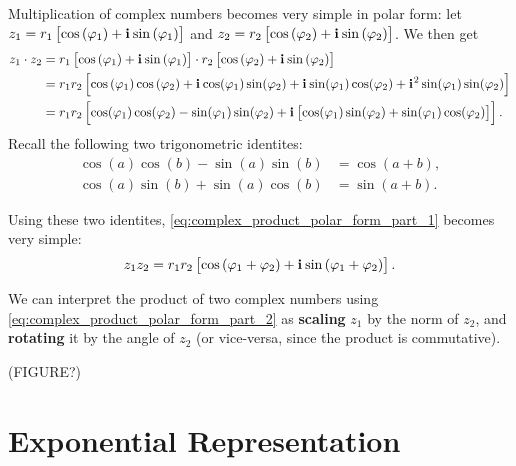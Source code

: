 \documentclass{article}
\newcommand{\iu}{\mathbf{i}\mkern1mu}
\newcommand{\zpolar}[2]{#1\left[\cos\left(#2\right)+\iu\sin\left(#2\right)\right]}
\begin{document}
Multiplication of complex numbers becomes very simple in polar form: let $z_{1}=\zpolar{r_{1}}{\varphi_{1}}$ and $z_{2}=\zpolar{r_{2}}{\varphi_{2}}$. We then get
\begin{equation}
	\begin{aligned}
		z_{1}\cdot z_{2} & = \zpolar{r_{1}}{\varphi_{1}}\cdot\zpolar{r_{2}}{\varphi_{2}}                                                                                                                                                  \\
		                 & = r_{1}r_{2}\left[\cos\left(\varphi_{1}\right)\cos\left(\varphi_{2}\right) + \iu\cos(\varphi_{1})\sin(\varphi_{2}) + \iu\sin(\varphi_{1})\cos(\varphi_{2}) + \iu^{2}\sin(\varphi_{1})\sin(\varphi_{2}) \right] \\
		                 & = r_{1}r_{2}\left[\cos(\varphi_{1})\cos(\varphi_{2})-\sin(\varphi_{1})\sin(\varphi_{2}) + \iu\left[\cos(\varphi_{1})\sin(\varphi_{2})+\sin(\varphi_{1})\cos(\varphi_{2})\right]\right].
	\end{aligned}
	\label{eq:complex_product_polar_form_part_1}
\end{equation}
Recall the following two trigonometric identites:
\begin{equation}
	\begin{aligned}
		\cos(a)\cos(b)-\sin(a)\sin(b) & = \cos(a+b), \\
		\cos(a)\sin(b)+\sin(a)\cos(b) & = \sin(a+b).
	\end{aligned}
	\label{eq:trig_identites}
\end{equation}

Using these two identites, \autoref{eq:complex_product_polar_form_part_1} becomes very simple:
\begin{equation}
	z_{1}z_{2} = r_{1}r_{2}\zpolar{}{\varphi_{1}+\varphi_{2}}.
	\label{eq:complex_product_polar_form_part_2}
\end{equation}

We can interpret the product of two complex numbers using \autoref{eq:complex_product_polar_form_part_2} as \textbf{scaling} $z_{1}$ by the norm of $z_{2}$, and \textbf{rotating} it by the angle of $z_{2}$ (or vice-versa, since the product is commutative).

(FIGURE?)

\section{Exponential Representation}
\end{document}
